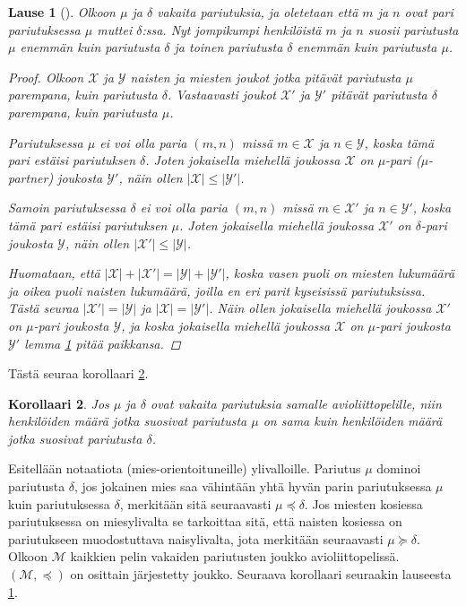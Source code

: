 \documentclass[finnish]{tktltiki2}
\newtheorem{lau}{Lause}
\newtheorem{kor}[lau]{Korollaari}
\theoremstyle{definition}
\theoremstyle{remark}
\begin{document}
\begin{lau} [\cite{gusfield1989stable}]\label{lause-guspref}
	Olkoon $\mu$ ja $\delta$ vakaita pariutuksia, ja oletetaan että $m$ ja $n$ ovat pari pariutuksessa $\mu$ muttei $\delta$:ssa. Nyt jompikumpi henkilöistä $m$ ja $n$ suosii pariutusta $\mu$ enemmän kuin pariutusta $\delta$ ja toinen pariutusta $\delta$ enemmän kuin pariutusta $\mu$.
\begin{proof}
Olkoon $\mathcal{X}$ ja $\mathcal{Y}$ naisten ja miesten joukot jotka pitävät pariutusta $\mu$ parempana, kuin pariutusta $\delta$. Vastaavasti joukot $\mathcal{X}'$ ja $\mathcal{Y}'$ pitävät pariutusta $\delta$ parempana, kuin pariutusta $\mu$.

Pariutuksessa $\mu$ ei voi olla paria $(m, n)$ missä $m \in \mathcal{X}$ ja $n \in \mathcal{Y}$, koska tämä pari estäisi pariutuksen $\delta$. Joten jokaisella miehellä joukossa $\mathcal{X}$ on $\mu$-pari (\emph{$\mu$-partner}) joukosta $\mathcal{Y'}$, näin ollen $|\mathcal{X}| \leq |\mathcal{Y'}|$.

Samoin pariutuksessa $\delta$ ei voi olla paria $(m, n)$ missä $m \in \mathcal{X}'$ ja $n \in \mathcal{Y}'$, koska tämä pari estäisi pariutuksen $\mu$. Joten jokaisella miehellä joukossa $\mathcal{X}'$ on $\delta$-pari joukosta $\mathcal{Y}$, näin ollen $|\mathcal{X}'| \leq |\mathcal{Y}|$.

Huomataan, että $|\mathcal{X}| + |\mathcal{X}'| = |\mathcal{Y}| + |\mathcal{Y}'|$, koska vasen puoli on miesten lukumäärä ja oikea puoli naisten lukumäärä, joilla en eri parit kyseisissä pariutuksissa. Tästä seuraa $|\mathcal{X}'| = |\mathcal{Y}|$ ja $|\mathcal{X}| = |\mathcal{Y}'|$. Näin ollen jokaisella miehellä joukossa $\mathcal{X}'$ on $\mu$-pari joukosta $\mathcal{Y}$, ja koska jokaisella miehellä joukossa $\mathcal{X}$ on $\mu$-pari joukosta $\mathcal{Y}'$ lemma \ref{lause-guspref} pitää paikkansa.
\end{proof}
\end{lau}

Tästä seuraa korollaari \ref{eqkor}.

\begin{kor}\label{eqkor}
Jos $\mu$ ja $\delta$ ovat vakaita pariutuksia samalle avioliittopelille, niin henkilöiden määrä jotka suosivat pariutusta $\mu$ on sama kuin henkilöiden määrä jotka suosivat pariutusta $\delta$.
\end{kor}

Esitellään notaatiota (mies-orientoituneille) ylivalloille. Pariutus $\mu$ dominoi pariutusta $\delta$, jos jokainen mies saa vähintään yhtä hyvän parin pariutuksessa $\mu$ kuin pariutuksessa $\delta$, merkitään sitä seuraavasti $\mu \preceq \delta$.
Jos miesten kosiessa pariutuksessa on miesylivalta se tarkoittaa sitä, että naisten kosiessa on pariutukseen muodostuttava naisylivalta, jota merkitään seuraavasti $\mu \succeq \delta$. Olkoon $\mathcal{M}$ kaikkien pelin vakaiden pariutusten joukko avioliittopelissä. $(\mathcal{M}, \preceq)$ on osittain järjestetty joukko.
Seuraava korollaari seuraakin lauseesta \ref{lause-guspref}.
\end{document}
